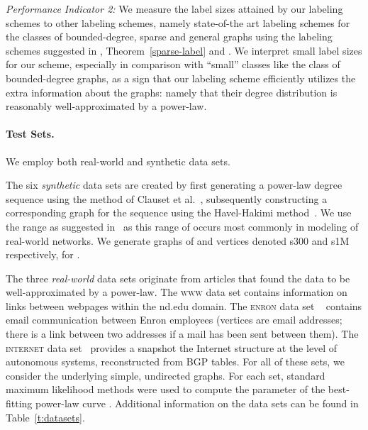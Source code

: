 \documentclass{article}
\theoremstyle{remark}
\begin{document}
\emph{Performance Indicator 2:} We  measure the label sizes attained by our labeling schemes to other labeling schemes, namely state-of-the art labeling schemes for the classes of bounded-degree, sparse and general graphs using the  labeling schemes suggested in \cite{adjiashvili2014labeling},  Theorem~\ref{sparse-label} and \cite{alstrup2014adjacency}. We interpret small label sizes for our scheme, especially in comparison with ``small'' classes like the class of bounded-degree graphs, as a sign that our labeling scheme efficiently utilizes the extra information about the graphs: namely that their degree distribution is reasonably well-approximated by a power-law.
 

\paragraph{Test Sets.}
We employ both real-world and synthetic data sets. 

The six \emph{synthetic} data sets are created by first generating a power-law degree sequence using the method of Clauset et al.~\cite[App.\ D]{clauset2009power}, subsequently constructing a corresponding graph for the sequence using the Havel-Hakimi method~\cite{hakimi1962realizability}. 
We use the range  as suggested in~\cite{clauset2009power} as this range of  occurs most commonly in modeling of real-world networks. We generate graphs of  and  vertices denoted  s300  and s1M  respectively, for . 


The three \emph{real-world} data sets originate  from articles that found the data to be well-approximated by a power-law. 
The \textsc{www} data set  \cite{albert1999internet} contains information on links between webpages within the nd.edu domain. 
The \textsc{enron} data set ~\cite{leskovec2009community}  contains email communication between  Enron employees (vertices are email addresses; there is a link between two addresses
if a mail has been sent between them).
The \textsc{internet} data set~\cite{newman} provides a snapshot the Internet structure at the level of  autonomous systems, reconstructed from BGP tables. 
For all of these sets, we consider the underlying simple, undirected graphs. For each set, standard maximum likelihood methods were used to compute the parameter
 of the best-fitting power-law curve \cite{clauset2009power}. Additional information on the data sets can be found in Table~\ref{t:datasets}.
\end{document}

